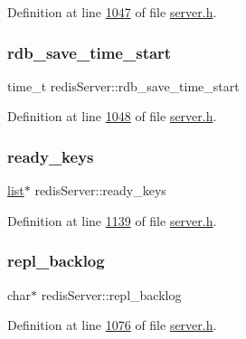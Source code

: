 Definition at line \hyperlink{server_8h_source_l01047}{1047} of file \hyperlink{server_8h_source}{server.\+h}.

\mbox{\label{structredisServer_ad40e584c0853ff155e0a2d7255fd4662}} 
\subsubsection{\texorpdfstring{rdb\+\_\+save\+\_\+time\+\_\+start}{rdb\_save\_time\_start}}
{\footnotesize\ttfamily time\+\_\+t redis\+Server\+::rdb\+\_\+save\+\_\+time\+\_\+start}



Definition at line \hyperlink{server_8h_source_l01048}{1048} of file \hyperlink{server_8h_source}{server.\+h}.

\mbox{\label{structredisServer_a52e3b0632e3939a0bfaba1a9fea780b6}} 
\subsubsection{\texorpdfstring{ready\+\_\+keys}{ready\_keys}}
{\footnotesize\ttfamily \hyperlink{structlist}{list}$\ast$ redis\+Server\+::ready\+\_\+keys}



Definition at line \hyperlink{server_8h_source_l01139}{1139} of file \hyperlink{server_8h_source}{server.\+h}.

\mbox{\label{structredisServer_a87051256574ac5ae9beefec748546e96}} 
\subsubsection{\texorpdfstring{repl\+\_\+backlog}{repl\_backlog}}
{\footnotesize\ttfamily char$\ast$ redis\+Server\+::repl\+\_\+backlog}



Definition at line \hyperlink{server_8h_source_l01076}{1076} of file \hyperlink{server_8h_source}{server.\+h}.

